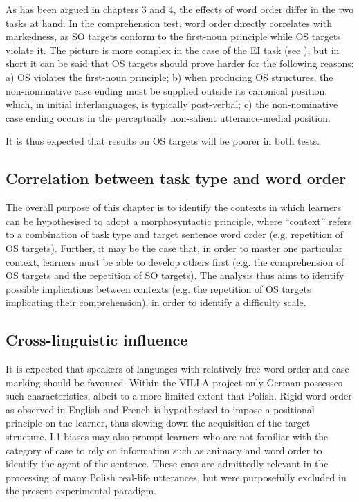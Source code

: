 As has been argued in chapters 3 and 4, the effects of word order differ in the two tasks at hand. In the comprehension test, word order directly correlates with markedness, as SO targets conform to the first-noun principle while OS targets violate it. The picture is more complex in the case of the EI task (see ), but in short it can be said that OS targets should prove harder for the following reasons: a) OS violates the first-noun principle; b) when producing OS structures, the non-nominative case ending must be supplied outside its canonical position, which, in initial interlanguages, is typically post-verbal; c) the non-nominative case ending occurs in the perceptually non-salient utterance-medial position.

It is thus expected that results on OS targets will be poorer in both tests.

\subsection{Correlation between task type and word order}\label{sec:06:1.3}

The overall purpose of this chapter is to identify the contexts in which learners can be hypothesised to adopt a morphosyntactic principle, where “context” refers to a combination of task type and target sentence word order (e.g. repetition of OS targets). Further, it may be the case that, in order to master one particular context, learners must be able to develop others first (e.g. the comprehension of OS targets and the repetition of SO targets). The analysis thus aims to identify possible implications between contexts (e.g. the repetition of OS targets implicating their comprehension), in order to identify a difficulty scale. 

\subsection{Cross-linguistic influence}\label{sec:06:1.4}

It is expected that speakers of languages with relatively free word order and case marking should be favoured. Within the VILLA project only German possesses such characteristics, albeit to a more limited extent that Polish. Rigid word order as observed in English and French is hypothesised to impose a positional principle on the learner, thus slowing down the acquisition of the target structure. L1 biases may also prompt learners who are not familiar with the category of case to rely on information such as animacy and word order to identify the agent of the sentence. These cues are admittedly relevant in the processing of many Polish real-life utterances, but were purposefully excluded in the present experimental paradigm.

